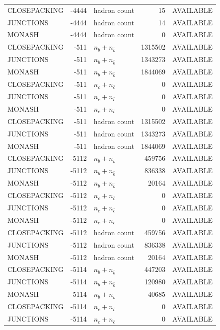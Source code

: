 \begin{landscape}
\begin{longtable}{@{}lrlrl@{}}
CLOSEPACKING & -4444 & hadron count & \num{15} & AVAILABLE \\
JUNCTIONS & -4444 & hadron count & \num{14} & AVAILABLE \\
MONASH & -4444 & hadron count & \num{0} & AVAILABLE \\
CLOSEPACKING & -511 & $n_b+n_{\bar b}$ & \num{1315502} & AVAILABLE \\
JUNCTIONS & -511 & $n_b+n_{\bar b}$ & \num{1343273} & AVAILABLE \\
MONASH & -511 & $n_b+n_{\bar b}$ & \num{1844069} & AVAILABLE \\
CLOSEPACKING & -511 & $n_c+n_{\bar c}$ & \num{0} & AVAILABLE \\
JUNCTIONS & -511 & $n_c+n_{\bar c}$ & \num{0} & AVAILABLE \\
MONASH & -511 & $n_c+n_{\bar c}$ & \num{0} & AVAILABLE \\
CLOSEPACKING & -511 & hadron count & \num{1315502} & AVAILABLE \\
JUNCTIONS & -511 & hadron count & \num{1343273} & AVAILABLE \\
MONASH & -511 & hadron count & \num{1844069} & AVAILABLE \\
CLOSEPACKING & -5112 & $n_b+n_{\bar b}$ & \num{459756} & AVAILABLE \\
JUNCTIONS & -5112 & $n_b+n_{\bar b}$ & \num{836338} & AVAILABLE \\
MONASH & -5112 & $n_b+n_{\bar b}$ & \num{20164} & AVAILABLE \\
CLOSEPACKING & -5112 & $n_c+n_{\bar c}$ & \num{0} & AVAILABLE \\
JUNCTIONS & -5112 & $n_c+n_{\bar c}$ & \num{0} & AVAILABLE \\
MONASH & -5112 & $n_c+n_{\bar c}$ & \num{0} & AVAILABLE \\
CLOSEPACKING & -5112 & hadron count & \num{459756} & AVAILABLE \\
JUNCTIONS & -5112 & hadron count & \num{836338} & AVAILABLE \\
MONASH & -5112 & hadron count & \num{20164} & AVAILABLE \\
CLOSEPACKING & -5114 & $n_b+n_{\bar b}$ & \num{447203} & AVAILABLE \\
JUNCTIONS & -5114 & $n_b+n_{\bar b}$ & \num{120980} & AVAILABLE \\
MONASH & -5114 & $n_b+n_{\bar b}$ & \num{40685} & AVAILABLE \\
CLOSEPACKING & -5114 & $n_c+n_{\bar c}$ & \num{0} & AVAILABLE \\
JUNCTIONS & -5114 & $n_c+n_{\bar c}$ & \num{0} & AVAILABLE \\

\end{longtable}
\end{landscape}
